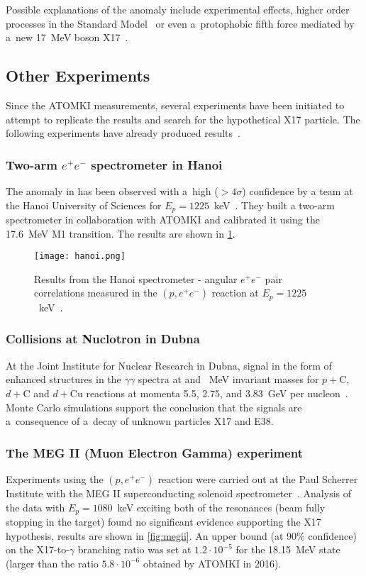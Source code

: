 				Possible explanations of the anomaly include experimental effects, higher order processes in the Standard Model~\cite{kalman,aleksejevs} or even a~protophobic fifth force mediated by a~new 17~MeV boson X17~\cite{feng}.
		\subsection{Other Experiments}
			Since the ATOMKI measurements, several experiments have been initiated to attempt to replicate the results and search for the hypothetical X17 particle. The following experiments have already produced results~\cite{atomki_review}.
			
			\subsubsection{Two-arm $e^+e^-$ spectrometer in Hanoi}
				The anomaly in  has been observed with a~high ($>4\sigma$) confidence by a team at the Hanoi University of Sciences for $E_p = 1225$~keV~\cite{hanoi}. They built a two\nobreakdash-arm spectrometer in collaboration with ATOMKI and calibrated it using the 17.6~MeV M1 transition. The results are shown in \cref{fig:hanoi}.
				
				\begin{figure}
					\centering
					\texttt{[image: hanoi.png]}
					\caption{Results from the Hanoi spectrometer - angular $e^+e^-$ pair correlations measured in the $(p,e^+e^-)$ reaction at $E_p = 1225$~keV~\cite{hanoi}.}
					\label{fig:hanoi}
				\end{figure}
			
			\subsubsection{Collisions at Nuclotron in Dubna}
				At the Joint Institute for Nuclear Research in Dubna, signal in the form of enhanced structures in the $\gamma\gamma$ spectra at  and ~MeV invariant masses for $p+\mathrm{C}$, $d+\mathrm{C}$ and $d+\mathrm{Cu}$ reactions at momenta 5.5, 2.75, and 3.83~GeV per nucleon~\cite{dubna}. Monte Carlo simulations support the conclusion that the signals are a~consequence of a~decay of unknown particles X17 and E38.
				
			\subsubsection{The MEG II (Muon Electron Gamma) experiment}
				Experiments using the $(p,e^+e^-)$ reaction were carried out at the Paul Scherrer Institute with the MEG II superconducting solenoid spectrometer~\cite{megii}. Analysis of the data with $E_p = 1080$~keV exciting both of the resonances (beam fully stopping in the target) found no significant evidence supporting the X17 hypothesis, results are shown in \cref{fig:megii}. An upper bound (at 90\% confidence) on the X17\nobreakdash-to\nobreakdash-$\gamma$ branching ratio was set at $1.2\cdot10^{-5}$ for the 18.15~MeV state (larger than the ratio $5.8\cdot10^{-6}$ obtained by ATOMKI in 2016).
				
